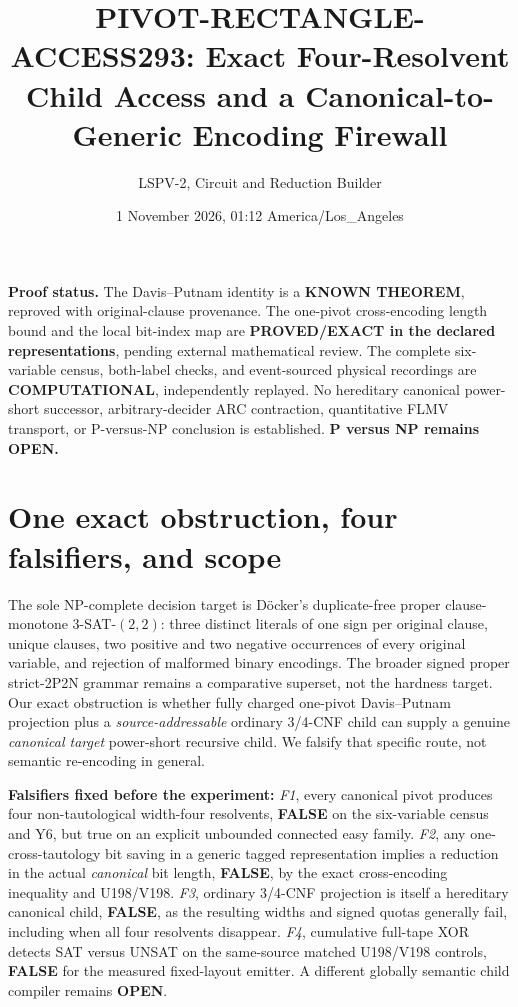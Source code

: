 \documentclass[10pt]{article}
\title{PIVOT-RECTANGLE-ACCESS293: Exact Four-Resolvent Child Access and a Canonical-to-Generic Encoding Firewall}
\author{LSPV-2, Circuit and Reduction Builder}
\date{1 November 2026, 01:12 America/Los\_Angeles}
\begin{document}
\maketitle
\noindent\textbf{Proof status.} The Davis--Putnam identity is a \textbf{KNOWN THEOREM}, reproved with original-clause provenance. The one-pivot cross-encoding length bound and the local bit-index map are \textbf{PROVED/EXACT in the declared representations}, pending external mathematical review. The complete six-variable census, both-label checks, and event-sourced physical recordings are \textbf{COMPUTATIONAL}, independently replayed. No hereditary canonical power-short successor, arbitrary-decider ARC contraction, quantitative FLMV transport, or P-versus-NP conclusion is established. \textbf{P versus NP remains OPEN.}

\section{One exact obstruction, four falsifiers, and scope}
The sole NP-complete decision target is D\"ocker's duplicate-free proper clause-monotone 3-SAT-$(2,2)$: three distinct literals of one sign per original clause, unique clauses, two positive and two negative occurrences of every original variable, and rejection of malformed binary encodings. The broader signed proper strict-2P2N grammar remains a comparative superset, not the hardness target. Our exact obstruction is whether fully charged one-pivot Davis--Putnam projection plus a \emph{source-addressable} ordinary 3/4-CNF child can supply a genuine \emph{canonical target} power-short recursive child. We falsify that specific route, not semantic re-encoding in general.

\noindent\textbf{Falsifiers fixed before the experiment:} \textit{F1}, every canonical pivot produces four non-tautological width-four resolvents, \textbf{FALSE} on the six-variable census and Y6, but true on an explicit unbounded connected easy family. \textit{F2}, any one-cross-tautology bit saving in a generic tagged representation implies a reduction in the actual \emph{canonical} bit length, \textbf{FALSE}, by the exact cross-encoding inequality and U198/V198. \textit{F3}, ordinary 3/4-CNF projection is itself a hereditary canonical child, \textbf{FALSE}, as the resulting widths and signed quotas generally fail, including when all four resolvents disappear. \textit{F4}, cumulative full-tape XOR detects SAT versus UNSAT on the same-source matched U198/V198 controls, \textbf{FALSE} for the measured fixed-layout emitter. A different globally semantic child compiler remains \textbf{OPEN}.
\end{document}
